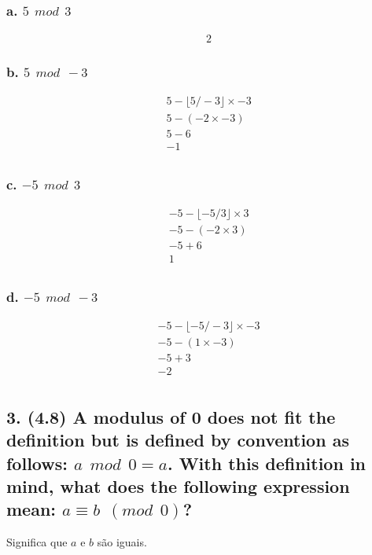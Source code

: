 \documentclass[fleqn, 12pt]{article}
\begin{document}
  \subsubsection*{a. $5 \ \ mod \ \ 3$}
    \begin{align*}
      & 2
    \end{align*}
  \subsubsection*{b. $5 \ \ mod \ \ -3$}
    \begin{align*}
      & 5 - \lfloor 5 / -3 \rfloor \times -3 \\
      & 5 - (-2 \times -3) \\
      & 5 - 6 \\
      & -1 \\
    \end{align*}
  \subsubsection*{c.  $-5 \ \ mod \ \ 3$}
    \begin{align*}
      & -5 - \lfloor -5 / 3 \rfloor \times 3 \\
      & -5 - (-2 \times 3) \\
      & -5 + 6 \\
      & 1 \\
    \end{align*}
  \subsubsection*{d. $-5 \ \ mod \ \ -3$}
    \begin{align*}
      & -5 - \lfloor -5 / -3 \rfloor \times -3 \\
      & -5 - (1 \times -3) \\
      & -5 + 3 \\
      & -2 \\
    \end{align*}

\subsection*{3. (4.8) A modulus of 0 does not fit the definition but is defined
by convention as follows: $a \ \ mod \ \ 0 = a$. With this definition in mind,
what does the following expression mean: $a \equiv b \ \ (mod \ \ 0)$?}

  Significa que $a$ e $b$ são iguais.
\end{document}
